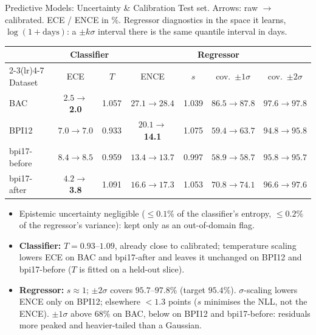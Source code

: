 \documentclass[aspectratio=169]{beamer} %
\begin{document}
\begin{frame}{Predictive Models: Uncertainty \& Calibration}
  \footnotesize
  Test set. Arrows: raw $\rightarrow$ calibrated. ECE / ENCE in \%. Regressor diagnostics in the space it
  learns, $\log(1+\text{days})$: a $\pm k\sigma$ interval there is the same quantile interval in days.
  \begin{center}\setlength{\tabcolsep}{4pt}
  \begin{tabular}{lcccccc}
    \toprule
     & \multicolumn{2}{c}{Classifier} & \multicolumn{4}{c}{Regressor} \\
    \cmidrule(lr){2-3}\cmidrule(lr){4-7}
    Dataset & ECE & $T$ & ENCE & $s$ & cov.\ $\pm1\sigma$ & cov.\ $\pm2\sigma$ \\
    \midrule
    BAC          & $2.5 \rightarrow$ \textbf{2.0} & 1.057 & $27.1 \rightarrow 28.4$          & 1.039 & $86.5 \rightarrow 87.8$ & $97.6 \rightarrow 97.8$ \\
    BPI12        & $7.0 \rightarrow 7.0$          & 0.933 & $20.1 \rightarrow$ \textbf{14.1} & 1.075 & $59.4 \rightarrow 63.7$ & $94.8 \rightarrow 95.8$ \\
    bpi17-before & $8.4 \rightarrow 8.5$          & 0.959 & $13.4 \rightarrow 13.7$          & 0.997 & $58.9 \rightarrow 58.7$ & $95.8 \rightarrow 95.7$ \\
    bpi17-after  & $4.2 \rightarrow$ \textbf{3.8} & 1.091 & $16.6 \rightarrow 17.3$          & 1.053 & $70.8 \rightarrow 74.1$ & $96.6 \rightarrow 97.6$ \\
    \bottomrule
  \end{tabular}
  \end{center}
  \vspace{-0.2cm}
  \scriptsize
  \begin{itemize}
    \item \alert{Epistemic} uncertainty negligible ($\le 0.1\%$ of the classifier's entropy, $\le 0.2\%$ of the
      regressor's variance): kept only as an out-of-domain flag.
    \item \textbf{Classifier:} $T = 0.93$--$1.09$, already close to calibrated; temperature scaling lowers ECE on
      BAC and bpi17-after and leaves it unchanged on BPI12 and bpi17-before ($T$ is fitted on a held-out slice).
    \item \textbf{Regressor:} $s \approx 1$; $\pm2\sigma$ covers $95.7$--$97.8\%$ (target $95.4\%$). $\sigma$-scaling
      lowers ENCE only on BPI12; elsewhere $< 1.3$ points ($s$ minimises the NLL, not the ENCE). $\pm1\sigma$
      above $68\%$ on BAC, below on BPI12 and bpi17-before: residuals more peaked and heavier-tailed than a
      Gaussian.
  \end{itemize}
\end{frame}
\end{document}
